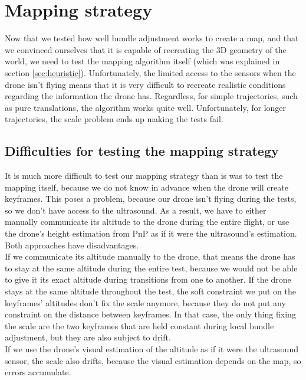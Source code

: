 \section{Mapping strategy}
Now that we tested how well bundle adjustment works to create a map, and that we convinced ourselves that it is capable of recreating the 3D geometry of the world, we need to test the mapping algorithm itself (which was explained in section \ref{sec:heuristic}). Unfortunately, the limited access to the sensors when the drone isn't flying means that it is very difficult to recreate realistic conditions regarding the information the drone has. Regardless, for simple trajectories, such as pure translations, the algorithm works quite well. Unfortunately, for longer trajectories, the scale problem ends up making the tests fail.

\subsection{Difficulties for testing the mapping strategy}\label{sec:difficult}
It is much more difficult to test our mapping strategy than is was to test the mapping itself, because we do not know in advance when the drone will create keyframes. This poses a problem, because our drone isn't flying during the tests, so we don't have access to the ultrasound. As a result, we have to either manually communicate its altitude to the drone during the entire flight, or use the drone's height estimation from PnP as if it were the ultrasound's estimation. Both approaches have disadvantages.\\

If we communicate its altitude manually to the drone, that means the drone has to stay at the same altitude during the entire test, because we would not be able to give it its exact altitude during transitions from one to another. If the drone stays at the same altitude throughout the test, the soft constraint we put on the keyframes' altitudes don't fix the scale anymore, because they do not put any constraint on the distance between keyframes. In that case, the only thing fixing the scale are the two keyframes that are held constant during local bundle adjustment, but they are also subject to drift.\\

If we use the drone's visual estimation of the altitude as if it were the ultrasound sensor, the scale also drifts, because the visual estimation depends on the map, so errors accumulate.\\


